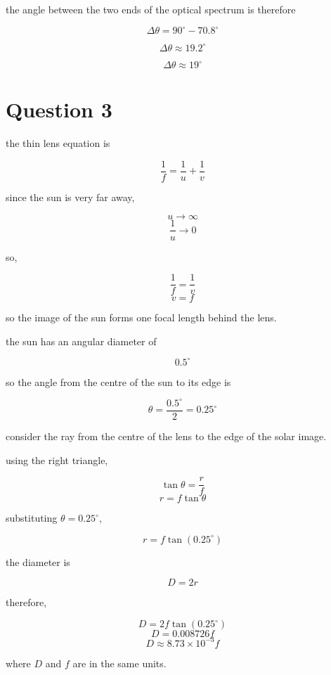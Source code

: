 \documentclass{article}
\begin{document}
the angle between the two ends of the optical spectrum is therefore

\[
\Delta\theta
=
90^\circ-70.8^\circ
\]

\[
\Delta\theta\approx19.2^\circ
\]

\[
\boxed{\Delta\theta\approx19^\circ}
\]

\section*{Question 3}

the thin lens equation is

\[
\frac{1}{f}=\frac{1}{u}+\frac{1}{v}
\]

since the sun is very far away,

\[
u\rightarrow\infty
\]
\[
\frac{1}{u}\rightarrow0
\]

so,

\[
\frac{1}{f}=\frac{1}{v}
\]
\[
\boxed{v=f}
\]

so the image of the sun forms one focal length behind the lens.

the sun has an angular diameter of

\[
0.5^\circ
\]

so the angle from the centre of the sun to its edge is

\[
\theta=\frac{0.5^\circ}{2}=0.25^\circ
\]

consider the ray from the centre of the lens to the edge of the solar image.

using the right triangle,

\[
\tan\theta=\frac{r}{f}
\]
\[
r=f\tan\theta
\]

substituting $\theta=0.25^\circ$,

\[
r=f\tan(0.25^\circ)
\]

the diameter is

\[
D=2r
\]

therefore,

\[
D=2f\tan(0.25^\circ)
\]
\[
D=0.008726f
\]
\[
\boxed{D\approx8.73\times10^{-3}f}
\]

where $D$ and $f$ are in the same units.
\end{document}
